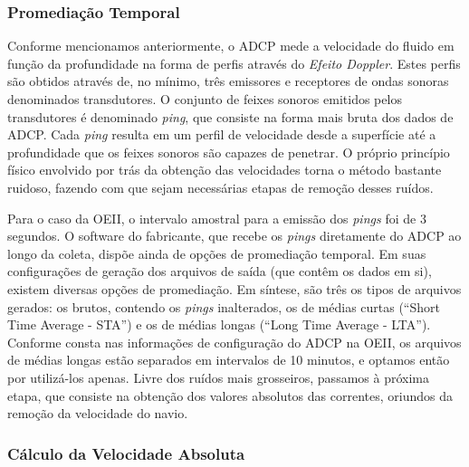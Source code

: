 \subsubsection{Promediação Temporal}\label{sec:lta}

\hspace{6mm} Conforme mencionamos anteriormente, o ADCP mede a velocidade do fluido em função 
da profundidade na forma de perfis através do {\it Efeito Doppler}. Estes perfis são obtidos através
de, no mínimo, três emissores e receptores de ondas sonoras denominados transdutores. O conjunto de 
feixes sonoros emitidos pelos transdutores é denominado {\it ping}, que consiste na forma mais 
bruta dos dados de ADCP. Cada {\it ping} resulta em um perfil de velocidade desde a superfície
até a profundidade que os feixes sonoros são capazes de penetrar. O próprio princípio físico 
envolvido por trás da obtenção das velocidades torna o método bastante ruidoso, fazendo com que
sejam necessárias etapas de remoção desses ruídos. 

Para o caso da OEII, o intervalo amostral para a emissão dos
{\it pings} foi de 3 segundos. O software do fabricante, que recebe os {\it pings} diretamente do ADCP ao longo da coleta, dispõe ainda
de opções de promediação temporal. Em suas con\-fi\-gu\-ra\-ções de geração dos arquivos de saída (que contêm os dados em si), 
existem diversas opções de promediação. Em síntese, são três os tipos de arquivos gerados: os brutos, contendo
os {\it pings} inalterados, os de médias curtas (``Short Time Average - STA'') e os de médias
longas (``Long Time Average - LTA''). Conforme consta nas informações de configuração do ADCP na OEII, os
arquivos de médias longas estão separados em intervalos de 10 minutos, e optamos então por utilizá-los apenas.
Livre dos ruídos mais grosseiros, passamos à próxima etapa, que consiste na obtenção dos valores absolutos das correntes, 
oriundos da remoção da velocidade do navio. 

\subsubsection{Cálculo da Velocidade Absoluta}\label{sec:wtrtrack}

